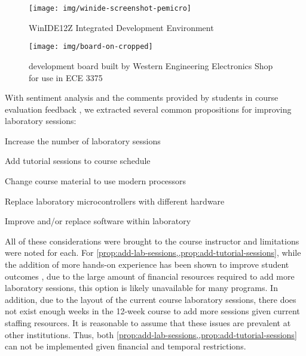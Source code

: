 \begin{figure}[bh!]
    \centering
    \texttt{[image: img/winide-screenshot-pemicro]}
    \caption{WinIDE12Z Integrated Development Environment \cite{winide-screenshot}}
    \label{fig:winide-screenshot-pemicro}
\end{figure}

\begin{figure}[bh!]
    \centering
    \texttt{[image: img/board-on-cropped]}
    \caption{\hcmodel{} development board built by Western Engineering Electronics Shop for use in ECE 3375}
    \label{fig:hc12-board}
\end{figure}

With sentiment analysis and the comments provided by students in course evaluation feedback \cite{evals:ece3375-2013, evals:ece3375-2014}, we extracted several common propositions for improving laboratory sessions: 

\begin{propositions}%
    \item Increase the number of laboratory sessions 
        \label{prop:add-lab-sessions}
    \item Add tutorial sessions to course schedule
        \label{prop:add-tutorial-sessions}
    \item Change course material to use modern processors
        \label{prop:change-course-materials}
    \item Replace laboratory microcontrollers with different hardware
        \label{prop:replace-hardware} %
    \item Improve and/or replace software within laboratory
        \label{prop:replace-software}
\end{propositions}

All of these considerations were brought to the course instructor and limitations were noted for each. For \cref{prop:add-lab-sessions,,prop:add-tutorial-sessions}, while the addition of more hands-on experience has been shown to improve student outcomes \cite{Ristov2011, Stolikj2011}, due to the large amount of financial resources required to add more laboratory sessions, this option is likely unavailable for many programs. In addition, due to the layout of the current course laboratory sessions, there does not exist enough weeks in the 12-week course to add more sessions given current staffing resources. It is reasonable to assume that these issues are prevalent at other institutions. Thus, both \cref{prop:add-lab-sessions,,prop:add-tutorial-sessions} can not be implemented given financial and temporal restrictions.

